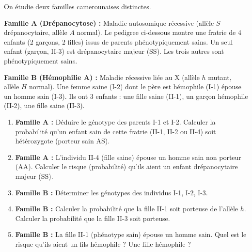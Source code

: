 \documentclass[11pt]{article}
\begin{document}
\begin{exercice}
On étudie deux familles camerounaises distinctes.

\textbf{Famille A (Drépanocytose) :} Maladie autosomique récessive (allèle $S$ drépanocytaire, allèle $A$ normal). Le pedigree ci-dessous montre une fratrie de 4 enfants (2 garçons, 2 filles) issus de parents phénotypiquement sains. Un seul enfant (garçon, II-3) est drépanocytaire majeur (SS). Les trois autres sont phénotypiquement sains.
\begin{center}
\end{center}

\textbf{Famille B (Hémophilie A) :} Maladie récessive liée au X (allèle $h$ mutant, allèle $H$ normal). Une femme saine (I-2) dont le père est hémophile (I-1) épouse un homme sain (I-3). Ils ont 3 enfants : une fille saine (II-1), un garçon hémophile (II-2), une fille saine (II-3).

\begin{enumerate}
\item \textbf{Famille A :} Déduire le génotype des parents I-1 et I-2. Calculer la probabilité qu'un enfant sain de cette fratrie (II-1, II-2 ou II-4) soit hétérozygote (porteur sain AS).
\item \textbf{Famille A :} L'individu II-4 (fille saine) épouse un homme sain non porteur (AA). Calculer le risque (probabilité) qu'ils aient un enfant drépanocytaire majeur (SS).
\item \textbf{Famille B :} Déterminer les génotypes des individus I-1, I-2, I-3.
\item \textbf{Famille B :} Calculer la probabilité que la fille II-1 soit porteuse de l'allèle $h$. Calculer la probabilité que la fille II-3 soit porteuse.
\item \textbf{Famille B :} La fille II-1 (phénotype sain) épouse un homme sain. Quel est le risque qu'ils aient un fils hémophile ? Une fille hémophile ?
\end{enumerate}
\end{exercice}
\end{document}
